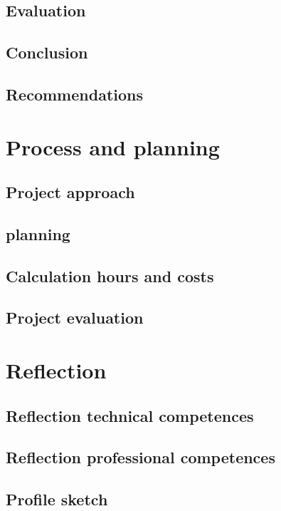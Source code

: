 \documentclass[12pt,a4paper]{report}
\begin{document}
\newpage
\section{Evaluation}

\section{Conclusion}

\newpage
\section{Recommendations}

\chapter{Process and planning}
\section{Project  approach}

\newpage
\section{planning}

\section{Calculation hours and costs}

\newpage
\section{Project evaluation}

\chapter{Reflection}
\section{Reflection technical competences}

\newpage
\section{Reflection professional competences}

\newpage
\section{Profile sketch}
\end{document}
